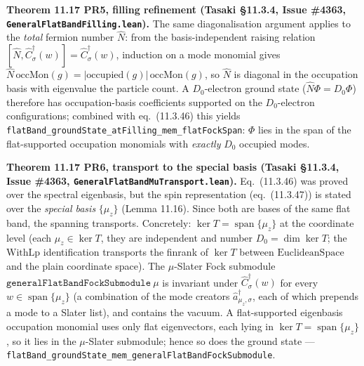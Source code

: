 \documentclass[a4paper,11pt]{article}
\begin{document}
\medskip\noindent\textbf{Theorem 11.17 PR5, filling refinement (Tasaki §11.3.4, Issue \#4363,
\texttt{GeneralFlatBandFilling.lean}).}  The same diagonalisation argument applies to the
\emph{total} fermion number $\hat N$: from the basis-independent raising relation
$[\hat N,\hat C^\dagger_\sigma(w)]=\hat C^\dagger_\sigma(w)$, induction on a mode monomial gives
$\hat N\,\mathrm{occMon}(g)=|\mathrm{occupied}(g)|\,\mathrm{occMon}(g)$, so $\hat N$ is diagonal in
the occupation basis with eigenvalue the particle count.  A $D_0$-electron ground state
($\hat N\Phi=D_0\Phi$) therefore has occupation-basis coefficients supported on the $D_0$-electron
configurations; combined with eq.~(11.3.46) this yields
\texttt{flatBand\_groundState\_atFilling\_mem\_flatFockSpan}: $\Phi$ lies in the span of the
flat-supported occupation monomials with \emph{exactly} $D_0$ occupied modes.

\medskip\noindent\textbf{Theorem 11.17 PR6, transport to the special basis (Tasaki §11.3.4, Issue
\#4363, \texttt{GeneralFlatBandMuTransport.lean}).}  Eq.~(11.3.46) was proved over the spectral
eigenbasis, but the spin representation (eq.~(11.3.47)) is stated over the \emph{special basis}
$\{\mu_z\}$ (Lemma 11.16).  Since both are bases of the same flat band, the spanning transports.
Concretely: $\ker T = \operatorname{span}\{\mu_z\}$ at the coordinate level (each $\mu_z\in\ker T$,
they are independent and number $D_0=\dim\ker T$; the $\mathrm{WithLp}$ identification transports
the finrank of $\ker T$ between $\mathrm{EuclideanSpace}$ and the plain coordinate space).  The
$\mu$-Slater Fock submodule $\mathtt{generalFlatBandFockSubmodule}\ \mu$ is invariant under
$\hat C^\dagger_\sigma(w)$ for every $w\in\operatorname{span}\{\mu_z\}$ (a combination of the mode
creators $\hat a^\dagger_{\mu_z,\sigma}$, each of which prepends a mode to a Slater list), and
contains the vacuum.  A flat-supported eigenbasis occupation monomial uses only flat eigenvectors,
each lying in $\ker T=\operatorname{span}\{\mu_z\}$, so it lies in the $\mu$-Slater submodule; hence
so does the ground state --- \texttt{flatBand\_groundState\_mem\_generalFlatBandFockSubmodule}.
\end{document}

